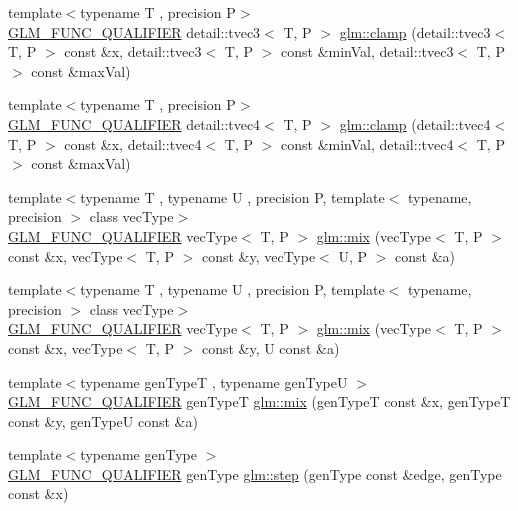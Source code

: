 \begin{DoxyCompactItemize}
\item 
{\footnotesize template$<$typename T , precision P$>$ }\\\hyperlink{setup_8hpp_a33fdea6f91c5f834105f7415e2a64407}{G\+L\+M\+\_\+\+F\+U\+N\+C\+\_\+\+Q\+U\+A\+L\+I\+F\+I\+ER} detail\+::tvec3$<$ T, P $>$ \hyperlink{namespaceglm_af80d006213e383bf05fd767386b14067}{glm\+::clamp} (detail\+::tvec3$<$ T, P $>$ const \&x, detail\+::tvec3$<$ T, P $>$ const \&min\+Val, detail\+::tvec3$<$ T, P $>$ const \&max\+Val)
\item 
{\footnotesize template$<$typename T , precision P$>$ }\\\hyperlink{setup_8hpp_a33fdea6f91c5f834105f7415e2a64407}{G\+L\+M\+\_\+\+F\+U\+N\+C\+\_\+\+Q\+U\+A\+L\+I\+F\+I\+ER} detail\+::tvec4$<$ T, P $>$ \hyperlink{namespaceglm_a0da32315c939ba1df21b2509df74e037}{glm\+::clamp} (detail\+::tvec4$<$ T, P $>$ const \&x, detail\+::tvec4$<$ T, P $>$ const \&min\+Val, detail\+::tvec4$<$ T, P $>$ const \&max\+Val)
\item 
{\footnotesize template$<$typename T , typename U , precision P, template$<$ typename, precision $>$ class vec\+Type$>$ }\\\hyperlink{setup_8hpp_a33fdea6f91c5f834105f7415e2a64407}{G\+L\+M\+\_\+\+F\+U\+N\+C\+\_\+\+Q\+U\+A\+L\+I\+F\+I\+ER} vec\+Type$<$ T, P $>$ \hyperlink{group__core__func__common_gadccbaffe46f369cf1a96b2aef92cbfdd}{glm\+::mix} (vec\+Type$<$ T, P $>$ const \&x, vec\+Type$<$ T, P $>$ const \&y, vec\+Type$<$ U, P $>$ const \&a)
\item 
{\footnotesize template$<$typename T , typename U , precision P, template$<$ typename, precision $>$ class vec\+Type$>$ }\\\hyperlink{setup_8hpp_a33fdea6f91c5f834105f7415e2a64407}{G\+L\+M\+\_\+\+F\+U\+N\+C\+\_\+\+Q\+U\+A\+L\+I\+F\+I\+ER} vec\+Type$<$ T, P $>$ \hyperlink{group__core__func__common_gaa5c83ada94113757c0a555ab4f40cd6e}{glm\+::mix} (vec\+Type$<$ T, P $>$ const \&x, vec\+Type$<$ T, P $>$ const \&y, U const \&a)
\item 
{\footnotesize template$<$typename gen\+TypeT , typename gen\+TypeU $>$ }\\\hyperlink{setup_8hpp_a33fdea6f91c5f834105f7415e2a64407}{G\+L\+M\+\_\+\+F\+U\+N\+C\+\_\+\+Q\+U\+A\+L\+I\+F\+I\+ER} gen\+TypeT \hyperlink{group__core__func__common_ga78aae7eea618ca112053d59fe03db239}{glm\+::mix} (gen\+TypeT const \&x, gen\+TypeT const \&y, gen\+TypeU const \&a)
\item 
{\footnotesize template$<$typename gen\+Type $>$ }\\\hyperlink{setup_8hpp_a33fdea6f91c5f834105f7415e2a64407}{G\+L\+M\+\_\+\+F\+U\+N\+C\+\_\+\+Q\+U\+A\+L\+I\+F\+I\+ER} gen\+Type \hyperlink{group__core__func__common_gaf21c84759af7799f573865f70c2f0a86}{glm\+::step} (gen\+Type const \&edge, gen\+Type const \&x)

\end{DoxyCompactItemize}
